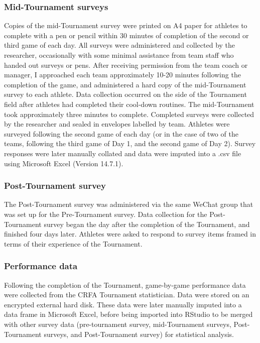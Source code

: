 \begin{CJK}{UTF8}{gbsn}
\subsubsection{Mid-Tournament surveys}
Copies of the mid-Tournament survey were printed on A4 paper for athletes to complete with a pen or pencil within 30 minutes of completion of the second or third game of each day. All surveys were administered and collected by the researcher, occasionally with some minimal assistance from team staff who handed out surveys or pens. After receiving permission from the team coach or manager, I approached each team approximately 10-20 minutes following the completion of the game, and administered a hard copy of the mid-Tournament survey to each athlete.  Data collection occurred on the side of the Tournament field after athletes had completed their cool-down routines.  The mid-Tournament took approximately three minutes to complete. Completed surveys were collected by the researcher and sealed in envelopes labelled by team. Athletes were surveyed following the second game of each day (or in the case of two of the teams, following the third game of Day 1, and the second game of Day 2).  Survey responses were later manually collated and data were imputed into a .csv file using Microsoft Excel (Version 14.7.1).

\subsubsection{Post-Tournament survey}
The Post-Tournament survey was administered via the same WeChat group that was set up for the Pre-Tournament survey. Data collection for the Post-Tournament survey began the day after the completion of the Tournament, and finished four days later. Athletes were asked to respond to survey items framed in terms of their experience of the Tournament.

\subsubsection{Performance data}
Following the completion of the Tournament, game-by-game performance data were collected from the CRFA Tournament statistician.  Data were stored on an encrypted external hard disk. These data were later manually imputed into a data frame in Microsoft Excel, before being imported into RStudio to be merged with other survey data (pre-tournament survey, mid-Tournament surveys, Post-Tournament surveys, and Post-Tournament survey) for statistical analysis.


\end{CJK}
